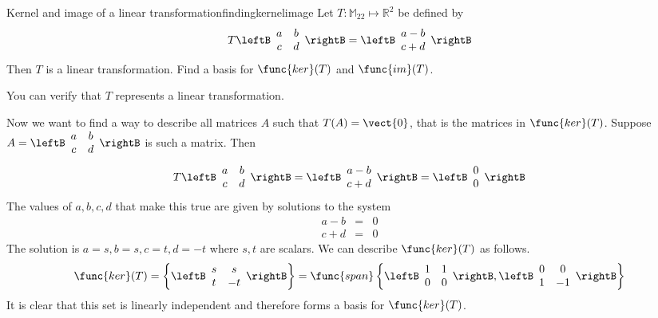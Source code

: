 \begin{example}{Kernel and image of a linear transformation}{findingkernelimage}
Let $T: \mathbb{M}_{22} \mapsto \mathbb{R}^2$ be defined by
\[
T \leftB \begin{array}{cc}
a & b \\
c & d 
\end{array}
\rightB
 = 
\leftB
\begin{array}{c}
a - b \\
c + d
\end{array}
\rightB
\]
Then $T$ is a linear transformation. Find a basis for $\func{ker} (T)$ and $\func{im}(T)$.
\end{example}

\begin{solution}
You can verify that $T$ represents a linear transformation. 

Now we want to find a way to describe all matrices $A$ such that $T(A) = \vect{0}$, that is the matrices in $\func{ker}(T)$. 
Suppose $A = \leftB \begin{array}{cc}
a & b \\
c & d 
\end{array}
\rightB$ is such a matrix. 
Then
\[
T \leftB \begin{array}{cc}
a & b \\
c & d 
\end{array}
\rightB
 = 
\leftB
\begin{array}{c}
a - b \\
c + d
\end{array}
\rightB
 = 
\leftB
\begin{array}{c}
0 \\
0
\end{array}
\rightB
\]
The values of $a, b, c, d$ that make this true are given by solutions to the system
\begin{eqnarray*}
a - b &=& 0 \\
c + d &=& 0 
\end{eqnarray*}
The solution is $a = s, b = s, c = t, d = -t$ where $s, t$ are scalars. We can describe $\func{ker}(T)$ as follows.
\[
\func{ker}(T) = 
\left\{ 
\leftB \begin{array}{cc}
s & s \\
t & -t 
\end{array}
\rightB
\right\}
=
\func{span}
\left\{
\leftB \begin{array}{cc}
1 & 1 \\
0 & 0 
\end{array} \rightB, 
\leftB \begin{array}{cc}
0 & 0 \\
1 & -1 
\end{array} \rightB
\right\}
\]
It is clear that this set is linearly independent and therefore forms a basis for $\func{ker}(T)$. 


\end{solution}
